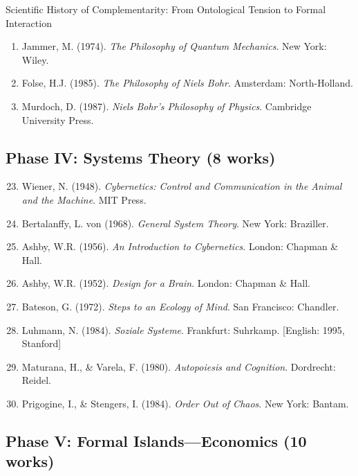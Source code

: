 \begin{chapter}{Scientific History of Complementarity: From Ontological Tension to Formal Interaction}
\begin{enumerate}
    \item Jammer, M. (1974). \textit{The Philosophy of Quantum Mechanics}. New York: Wiley.

    \item Folse, H.J. (1985). \textit{The Philosophy of Niels Bohr}. Amsterdam: North-Holland.

    \item Murdoch, D. (1987). \textit{Niels Bohr's Philosophy of Physics}. Cambridge University Press.
\end{enumerate}

\subsection{Phase IV: Systems Theory (8 works)}

\begin{enumerate}
    \setcounter{enumi}{22}
    \item Wiener, N. (1948). \textit{Cybernetics: Control and Communication in the Animal and the Machine}. MIT Press.

    \item Bertalanffy, L. von (1968). \textit{General System Theory}. New York: Braziller.

    \item Ashby, W.R. (1956). \textit{An Introduction to Cybernetics}. London: Chapman \& Hall.

    \item Ashby, W.R. (1952). \textit{Design for a Brain}. London: Chapman \& Hall.

    \item Bateson, G. (1972). \textit{Steps to an Ecology of Mind}. San Francisco: Chandler.

    \item Luhmann, N. (1984). \textit{Soziale Systeme}. Frankfurt: Suhrkamp. [English: 1995, Stanford]

    \item Maturana, H., \& Varela, F. (1980). \textit{Autopoiesis and Cognition}. Dordrecht: Reidel.

    \item Prigogine, I., \& Stengers, I. (1984). \textit{Order Out of Chaos}. New York: Bantam.
\end{enumerate}

\subsection{Phase V: Formal Islands---Economics (10 works)}


\end{chapter}
